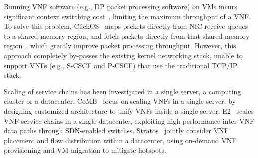 
Running VNF software (e.g., DP packet processing software) on VMs incurs significant context switching cost~\cite{rizzo2013speeding}, limiting the maximum throughput of a VNF. To solve this problem, ClickOS~\cite{martins2014clickos} maps packets directly from NIC receive queues to a shared memory region, and fetch packets directly from that shared memory region~\cite{dpdk}, which greatly improve packet processing throughput. However, this approach completely by-passes the existing kernel networking stack, unable to support VNFs (e.g., S-CSCF and P-CSCF) that use the traditional TCP/IP stack. %

Scaling of service chains has been investigated in a single server, a computing cluster or a datacenter. CoMB~\cite{sekar2012design} focus on scaling VNFs in a single server, %
 by designing customized architecture to unify VNFs inside a single server. %
 E2~\cite{palkar2015e2} scales VNF service chains in a single datacenter, %
 exploiting high-performance inter-VNF data paths through SDN-enabled switches. %
Stratos~\cite{gember2012stratos} %
 jointly consider VNF placement and flow distribution within a datacenter, using on-demand VNF provisioning and VM migration to mitigate hotspots.

